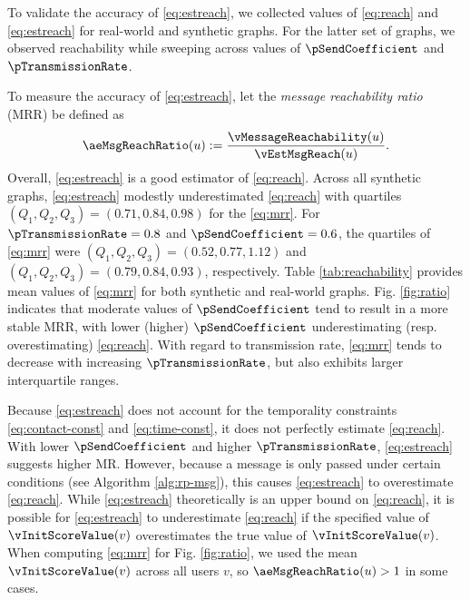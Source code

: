 To validate the accuracy of \eqref{eq:estreach}, we collected values of \eqref{eq:reach} and \eqref{eq:estreach} for real-world and synthetic graphs. For the latter set of graphs, we observed reachability while sweeping across values of $\pSendCoefficient$ and $\pTransmissionRate$.

To measure the accuracy of \eqref{eq:estreach}, let the \emph{message reachability ratio} (MRR) be defined as
\begin{equation}\label{eq:mrr}
	\aeMsgReachRatio(u) := \frac{\vMessageReachability(u)}{\vEstMsgReach(u)}.
\end{equation}
Overall, \eqref{eq:estreach} is a good estimator of \eqref{eq:reach}. Across all synthetic graphs, \eqref{eq:estreach} modestly underestimated \eqref{eq:reach} with quartiles $(Q_1, Q_2, Q_3) = (0.71, 0.84, 0.98)$ for the \eqref{eq:mrr}. For $\pTransmissionRate = 0.8$ and $\pSendCoefficient = 0.6$, the quartiles of \eqref{eq:mrr} were $(Q_1, Q_2, Q_3) = (0.52, 0.77, 1.12)$ and $(Q_1, Q_2, Q_3) = (0.79, 0.84, 0.93)$, respectively. Table \ref{tab:reachability} provides mean values of \eqref{eq:mrr} for both synthetic and real-world graphs. Fig. \ref{fig:ratio} indicates that moderate values of $\pSendCoefficient$ tend to result in a more stable MRR, with lower (higher) $\pSendCoefficient$ underestimating (resp. overestimating) \eqref{eq:reach}. With regard to transmission rate, \eqref{eq:mrr} tends to decrease with increasing $\pTransmissionRate$, but also exhibits larger interquartile ranges.

Because \eqref{eq:estreach} does not account for the temporality constraints \eqref{eq:contact-const} and \eqref{eq:time-const}, it does not perfectly estimate \eqref{eq:reach}. With lower $\pSendCoefficient$ and higher $\pTransmissionRate$, \eqref{eq:estreach} suggests higher MR. However, because a message is only passed under certain conditions (see Algorithm \ref{alg:rp-msg}), this causes \eqref{eq:estreach} to overestimate \eqref{eq:reach}. While \eqref{eq:estreach} theoretically is an upper bound on \eqref{eq:reach}, it is possible for \eqref{eq:estreach} to underestimate \eqref{eq:reach} if the specified value of $\vInitScoreValue(v)$ overestimates the true value of $\vInitScoreValue(v)$. When computing \eqref{eq:mrr} for Fig. \ref{fig:ratio}, we used the mean $\vInitScoreValue(v)$ across all users $v$, so $\aeMsgReachRatio(u) > 1$ in some cases.

